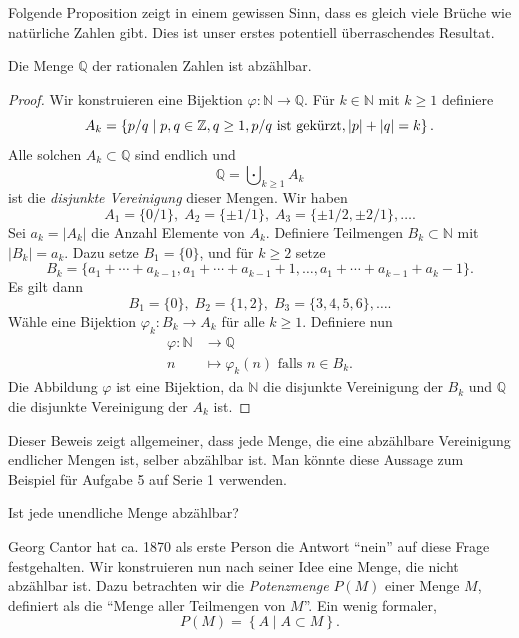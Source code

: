 \documentclass[../main.tex]{subfiles}
\begin{document}
Folgende Proposition zeigt in einem gewissen Sinn, dass es gleich viele Brüche
wie natürliche Zahlen gibt. Dies ist unser erstes potentiell überraschendes
Resultat.

\begin{manualproposition}{1}\label{prop:q-countable}
  Die Menge $\mathbb Q$ der rationalen Zahlen ist abzählbar.
\end{manualproposition}


\begin{proof}
  Wir konstruieren eine Bijektion $\varphi \colon \mathbb N \to \mathbb Q$.
  Für $k \in \mathbb N$ mit $k \geq 1$ definiere
  \[
    A_{k} = \left\{p/q \mid p, q \in \mathbb Z, q \geq 1, p/q \textup{ ist gekürzt},
    |p| + |q| = k\right\}.
  \]
  Alle solchen $A_{k} \subset \mathbb Q$ sind endlich und
  \[
    \mathbb Q = \bigcupdot_{k \geq 1} A_{k}
  \]
  ist die \textit{disjunkte Vereinigung} dieser Mengen.
  Wir haben
  \[
    A_{1} = \{0/1\}, \; A_{2} = \{\pm 1/1\}, \; A_{3} = \{\pm 1/2, \pm 2/1\}, \dots.
  \]
  Sei $a_{k} = |A_{k}|$ die Anzahl Elemente von $A_{k}$.
  Definiere Teilmengen $B_{k} \subset \mathbb N$ mit $|B_{k}| = a_{k}$.
  Dazu setze $B_{1} = \{0\}$, und für $k \geq 2$ setze
  \[
    B_{k} = \{a_{1} + \cdots + a_{k-1},
    a_{1} + \cdots + a_{k-1} + 1, \dots,
    a_{1} + \cdots + a_{k-1} + a_{k} - 1\}.
  \]
  Es gilt dann
  \[
    B_{1} = \{0\}, \; B_{2} = \{1, 2\}, \; B_{3} = \{3, 4, 5, 6\}, \dots.
  \]
Wähle eine Bijektion $\varphi_{k} \colon B_{k} \to A_{k}$ für alle $k \geq 1$.
Definiere nun
\begin{align*}
  \varphi \colon \mathbb N &\to \mathbb Q \\
  n &\mapsto \varphi_{k}(n) \mbox{ falls } n \in B_{k}.
\end{align*}
Die Abbildung $\varphi$ ist eine Bijektion, da $\mathbb N$ die disjunkte
Vereinigung der $B_{k}$ und $\mathbb Q$ die disjunkte Vereinigung
der $A_{k}$ ist.
\end{proof}

Dieser Beweis zeigt allgemeiner, dass jede Menge, die eine abzählbare Vereinigung
endlicher Mengen ist, selber abzählbar ist. Man könnte diese Aussage
zum Beispiel für Aufgabe 5 auf Serie 1 verwenden.

\begin{question}
  Ist jede unendliche Menge abzählbar?
\end{question}

Georg Cantor hat ca. 1870 als erste Person die Antwort ``nein'' auf diese Frage
festgehalten.
Wir konstruieren nun nach seiner Idee
eine Menge, die nicht abzählbar ist.
Dazu betrachten wir die \textit{Potenzmenge} $P(M)$
einer Menge $M$, definiert als die ``Menge aller Teilmengen von $M$''.
Ein wenig formaler,
\[P(M) = \left\{A \mid A \subset M\right\}.\]
\end{document}
